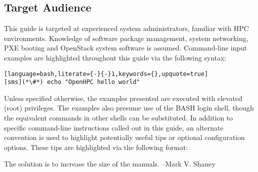 \subsection{Target Audience}

This guide is targeted at experienced \Linux{} system administrators, familiar with 
HPC environments. Knowledge of software package management, system 
networking, PXE booting and OpenStack system software is assumed. 
Command-line input examples are highlighted throughout this guide via the 
following syntax:

\begin{lstlisting}[language=bash,literate={-}{-}1,keywords={},upquote=true]
[sms](*\#*) echo "OpenHPC hello world"
\end{lstlisting}

Unless specified otherwise, the examples presented are executed with
elevated (root) privileges. The examples also presume use of the BASH login
shell, though the equivalent commands in other shells can be substituted.
In addition to specific command-line instructions called out in this guide, an
alternate convention is used to highlight potentially useful tips or optional
configuration options. These tips are highlighted via the following format:

\begin{center}
\begin{tcolorbox}[]
\small
The solution is to increase the size of the manuals. --Mark V. Shaney
\end{tcolorbox}
\end{center}

